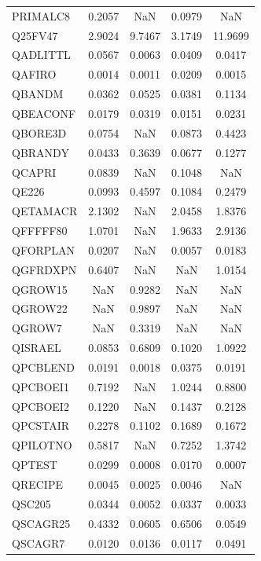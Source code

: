 \begin{longtable}{lcccc}
PRIMALC8 &   0.2057 &      NaN &   0.0979 &      NaN \\
Q25FV47  &   2.9024 &   9.7467 &   3.1749 &  11.9699 \\
QADLITTL &   0.0567 &   0.0063 &   0.0409 &   0.0417 \\
QAFIRO   &   0.0014 &   0.0011 &   0.0209 &   0.0015 \\
QBANDM   &   0.0362 &   0.0525 &   0.0381 &   0.1134 \\
QBEACONF &   0.0179 &   0.0319 &   0.0151 &   0.0231 \\
QBORE3D  &   0.0754 &      NaN &   0.0873 &   0.4423 \\
QBRANDY  &   0.0433 &   0.3639 &   0.0677 &   0.1277 \\
QCAPRI   &   0.0839 &      NaN &   0.1048 &      NaN \\
QE226    &   0.0993 &   0.4597 &   0.1084 &   0.2479 \\
QETAMACR &   2.1302 &      NaN &   2.0458 &   1.8376 \\
QFFFFF80 &   1.0701 &      NaN &   1.9633 &   2.9136 \\
QFORPLAN &   0.0207 &      NaN &   0.0057 &   0.0183 \\
QGFRDXPN &   0.6407 &      NaN &      NaN &   1.0154 \\
QGROW15  &      NaN &   0.9282 &      NaN &      NaN \\
QGROW22  &      NaN &   0.9897 &      NaN &      NaN \\
QGROW7   &      NaN &   0.3319 &      NaN &      NaN \\
QISRAEL  &   0.0853 &   0.6809 &   0.1020 &   1.0922 \\
QPCBLEND &   0.0191 &   0.0018 &   0.0375 &   0.0191 \\
QPCBOEI1 &   0.7192 &      NaN &   1.0244 &   0.8800 \\
QPCBOEI2 &   0.1220 &      NaN &   0.1437 &   0.2128 \\
QPCSTAIR &   0.2278 &   0.1102 &   0.1689 &   0.1672 \\
QPILOTNO &   0.5817 &      NaN &   0.7252 &   1.3742 \\
QPTEST   &   0.0299 &   0.0008 &   0.0170 &   0.0007 \\
QRECIPE  &   0.0045 &   0.0025 &   0.0046 &      NaN \\
QSC205   &   0.0344 &   0.0052 &   0.0337 &   0.0033 \\
QSCAGR25 &   0.4332 &   0.0605 &   0.6506 &   0.0549 \\
QSCAGR7  &   0.0120 &   0.0136 &   0.0117 &   0.0491 \\

\end{longtable}
